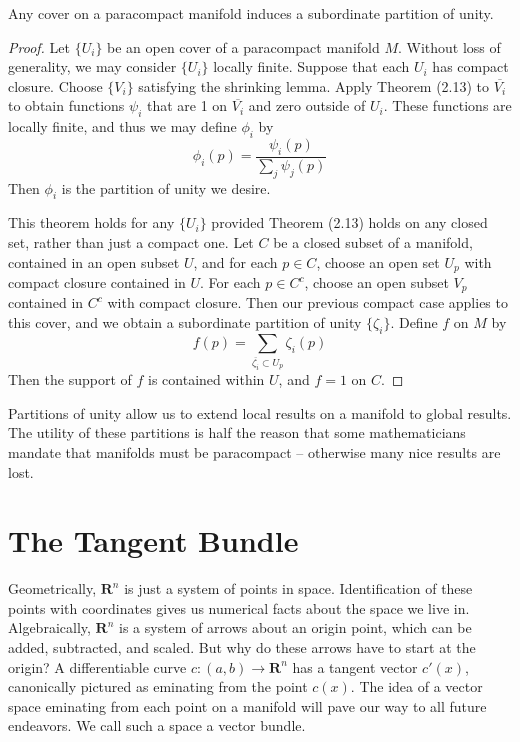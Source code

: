\begin{theorem}
    Any cover on a paracompact manifold induces a subordinate partition of unity.
\end{theorem}
\begin{proof}
    Let $\{ U_i \}$ be an open cover of a paracompact manifold $M$. Without loss of generality, we may consider $\{ U_i \}$ locally finite. Suppose that each $U_i$ has compact closure. Choose $\{ V_i \}$ satisfying the shrinking lemma. Apply Theorem (2.13) to $\overline{V_i}$ to obtain functions $\psi_i$ that are 1 on $\overline{V_i}$ and zero outside of $U_i$. These functions are locally finite, and thus we may define $\phi_i$ by
    \[ \phi_i(p) = \frac{\psi_i(p)}{\sum_j \psi_j(p)} \]
    Then $\phi_i$ is the partition of unity we desire.

    This theorem holds for any $\{ U_i \}$ provided Theorem (2.13) holds on any closed set, rather than just a compact one. Let $C$ be a closed subset of a manifold, contained in an open subset $U$, and for each $p \in C$, choose an open set $U_p$ with compact closure contained in $U$. For each $p \in C^c$, choose an open subset $V_p$ contained in $C^c$ with compact closure. Then our previous compact case applies to this cover, and we obtain a subordinate partition of unity $\{ \zeta_i \}$. Define $f$ on $M$ by
    \[ f(p) = \sum_{\overline{\zeta_i} \subset U_p} \zeta_i(p) \]
    Then the support of $f$ is contained within $U$, and $f = 1$ on $C$.
\end{proof}

Partitions of unity allow us to extend local results on a manifold to global results. The utility of these partitions is half the reason that some mathematicians mandate that manifolds must be paracompact -- otherwise many nice results are lost.

\chapter{The Tangent Bundle}

Geometrically, $\mathbf{R}^n$ is just a system of points in space. Identification of these points with coordinates gives us numerical facts about the space we live in. Algebraically, $\mathbf{R}^n$ is a system of arrows about an origin point, which can be added, subtracted, and scaled. But why do these arrows have to start at the origin? A differentiable curve $c:(a,b) \to \mathbf{R}^n$ has a tangent vector $c'(x)$, canonically pictured as eminating from the point $c(x)$. The idea of a vector space eminating from each point on a manifold will pave our way to all future endeavors. We call such a space a vector bundle.

